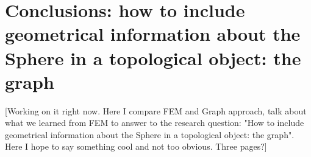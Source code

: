 

\section{Conclusions: how to include geometrical information about the Sphere in a topological object: the graph}
[Working on it right now. Here I compare FEM and Graph approach, talk about what we learned from FEM to answer to the research question: "How to include geometrical information about the Sphere in a topological object: the graph". Here I hope to say something cool and not too obvious. Three pages?]